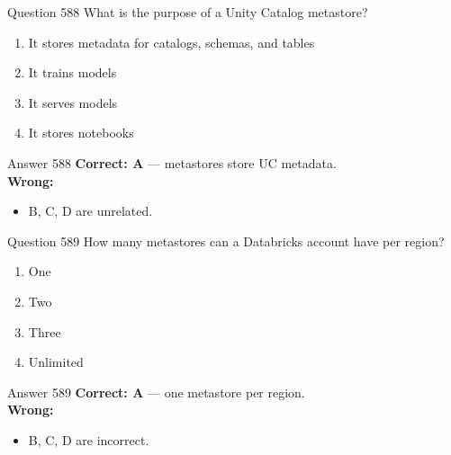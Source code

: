 \documentclass[aspectratio=169,11pt]{beamer}
\begin{document}
	\begin{frame}{Question 588}
		What is the purpose of a Unity Catalog metastore?
		\begin{enumerate}[label=\Alph*.]
			\item It stores metadata for catalogs, schemas, and tables
			\item It trains models
			\item It serves models
			\item It stores notebooks
		\end{enumerate}
	\end{frame}
	\begin{frame}{Answer 588}
		\textbf{Correct: A} --- metastores store UC metadata.\\
		\vspace{0.5em}
		\textbf{Wrong:}
		\begin{itemize}
			\item B, C, D are unrelated.
		\end{itemize}
	\end{frame}
	
	\begin{frame}{Question 589}
		How many metastores can a Databricks account have per region?
		\begin{enumerate}[label=\Alph*.]
			\item One
			\item Two
			\item Three
			\item Unlimited
		\end{enumerate}
	\end{frame}
	\begin{frame}{Answer 589}
		\textbf{Correct: A} --- one metastore per region.\\
		\vspace{0.5em}
		\textbf{Wrong:}
		\begin{itemize}
			\item B, C, D are incorrect.
		\end{itemize}
	\end{frame}
	
\end{document}
